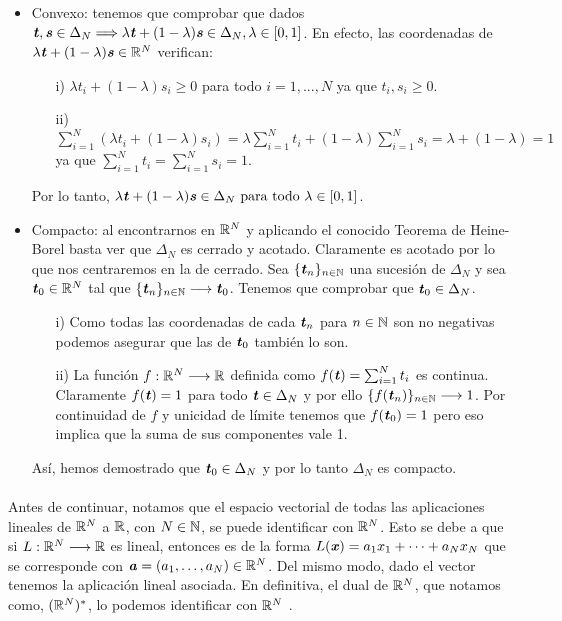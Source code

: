 	\begin{itemize}
		\item  Convexo: tenemos que comprobar que dados $ \textbf{\emph{t}}, \textbf{\emph{s}} \in \Delta_N  \Longrightarrow \lambda\textbf{\emph{t}} + (1-\lambda)\textbf{\emph{s}} \in \Delta_N, \lambda \in \lbrack 0,1 \rbrack$. En efecto, las coordenadas de $ \lambda\textbf{\emph{t}} + (1-\lambda)\textbf{\emph{s}} \in \mathbb{R}^N $ verifican:
		\begin{itemize}
			\item [i) ] $ \lambda t_i + (1-\lambda)s_i \geq 0 $ para todo $ i = 1,..., N $ ya que $ t_i, s_i \geq 0 $.
			\item [ii) ] $ \sum_{i=1}^{N} (\lambda t_i + (1-\lambda)s_i) =   \lambda \sum_{i=1}^{N} t_i + (1-\lambda)\sum_{i=1}^{N} s_i = \lambda + (1 - \lambda) = 1$ ya que $ \sum_{i=1}^{N} t_i = \sum_{i=1}^{N} s_i = 1  $.
		\end{itemize}
	
		Por lo tanto, $ \lambda\textbf{\emph{t}} + (1-\lambda)\textbf{\emph{s}} \in \Delta_N \text{ para todo }\lambda \in \lbrack 0,1 \rbrack $.
		
		\item Compacto: al encontrarnos en $ \mathbb{R}^N $ y aplicando el conocido Teorema de Heine-Borel basta ver que $ \Delta_N $ es cerrado y acotado. Claramente es acotado por lo que nos centraremos en la de cerrado. Sea $ \lbrace \textbf{\emph{t}}_n \rbrace_{ n \in \mathbb{N}} $ una sucesión de $ \Delta_N $ y sea $ \textbf{\emph{t}}_0 \in \mathbb{R}^N $ tal que $ \lbrace \textbf{\emph{t}}_n \rbrace_{ n \in \mathbb{N}} \longrightarrow \textbf{\emph{t}}_0 $. Tenemos que comprobar que $ \textbf{\emph{t}}_0 \in \Delta_N $. 
		\begin{itemize}
		\item[i) ] Como todas las coordenadas de cada $ \textbf{\emph{t}}_n $ para $ n \in \mathbb{N} $ son no negativas podemos asegurar que las de $ \textbf{\emph{t}}_0 $ también lo son.
		\item[ii) ] La función $ f: \mathbb{R}^N \longrightarrow \mathbb{R} $ definida como $ f(\textbf{\emph{t}}) =  \sum_{i=1}^{N} t_i $ es continua. Claramente $ f(\textbf{\emph{t}}) = 1 $ para todo $ \textbf{\emph{t}} \in \Delta_N $ y por ello $ \lbrace f(\textbf{\emph{t}}_n) \rbrace_{ n \in \mathbb{N}} \longrightarrow 1$. Por continuidad de $ f $ y unicidad de límite tenemos que $ f(\textbf{\emph{t}}_0) = 1 $ pero eso implica que la suma de sus componentes vale 1.
		\end{itemize} 
	
		Así, hemos demostrado que $ \textbf{\emph{t}}_0 \in \Delta_N $ y por lo tanto $ \Delta_N $ es compacto. 
	\end{itemize}

	
	\paragraph{}Antes de continuar, notamos que el espacio vectorial de todas las aplicaciones lineales de $ \mathbb{R}^N $ a $ \mathbb{R} $, con $ N \in \mathbb{N} $, se puede identificar con $ \mathbb{R}^N $. Esto se debe a que si $ L:\mathbb{R}^N \longrightarrow \mathbb{R} $ es lineal, entonces es de la forma $ L(\textbf{\emph{x}}) = a_1x_1 + \cdots + a_Nx_N $ que se corresponde con $ \textbf{\emph{a}} = (a_1,\dots,a_N) \in \mathbb{R}^N $. Del mismo modo, dado el vector tenemos la aplicación lineal asociada. En definitiva, el dual de 
	$ \mathbb{R}^N $, que notamos como, $ (\mathbb{R}^N)^* $, lo podemos identificar con $ \mathbb{R}^N $ .
